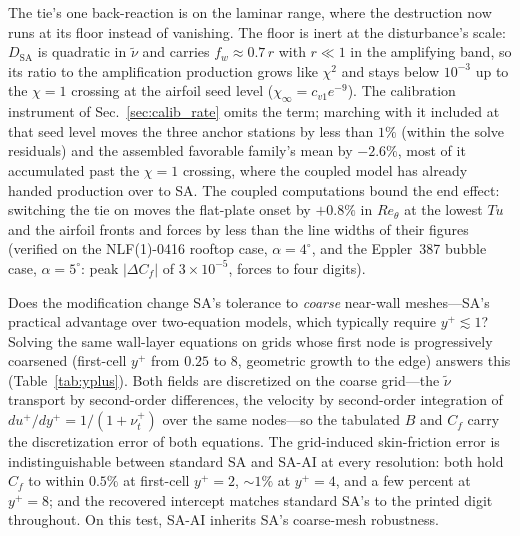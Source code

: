 \documentclass[journal]{new-aiaa}
\begin{document}
The tie's one back-reaction is on the laminar range, where the destruction
now runs at its floor instead of vanishing. The floor is inert at the
disturbance's scale: $D_\mathrm{SA}$ is quadratic in $\tilde\nu$ and
carries $f_w\!\approx\!0.7\,r$ with $r\!\ll\!1$ in the amplifying band,
so its ratio to the amplification production grows like $\chi^2$ and stays
below $10^{-3}$ up to the $\chi\!=\!1$ crossing at the airfoil seed level
($\chi_\infty\!=\!c_{v1}e^{-9}$). The calibration instrument of
Sec.~\ref{sec:calib_rate} omits the term; marching with it included at that
seed level moves the three anchor stations by less than $1\%$ (within the
solve residuals) and the assembled favorable family's mean by $-2.6\%$, most of it accumulated past the $\chi\!=\!1$ crossing,
where the coupled model has already handed production over to SA. The
coupled computations bound the end effect: switching the tie on moves the
flat-plate onset by $+0.8\%$ in $Re_\theta$ at the lowest $Tu$ and the
airfoil fronts and forces by less than the line widths of their figures
(verified on the NLF(1)-0416 rooftop case, $\alpha\!=\!4^\circ$, and the
Eppler~387 bubble case, $\alpha\!=\!5^\circ$: peak $|\Delta C_f|$ of
$3\!\times\!10^{-5}$, forces to four digits).

Does the modification change SA's tolerance to
\emph{coarse} near-wall meshes---SA's practical advantage over two-equation models,
which typically require $y^+\!\lesssim\!1$? Solving the same wall-layer equations on
grids whose first node is progressively coarsened (first-cell $y^+$ from $0.25$ to
$8$, geometric growth to the edge) answers this (Table~\ref{tab:yplus}). Both
fields are discretized on the coarse grid---the $\tilde\nu$ transport by
second-order differences, the velocity by second-order integration of
$du^+\!/dy^+\!=\!1/(1+\nu_t^+)$ over the same nodes---so the tabulated $B$
and $C_f$ carry the discretization error of both equations.
The grid-induced skin-friction error is indistinguishable between standard SA and
SA-AI at every resolution: both hold $C_f$ to within $0.5\%$ at first-cell
$y^+\!=\!2$, $\sim\!1\%$ at $y^+\!=\!4$, and a few percent at
$y^+\!=\!8$; and the recovered intercept matches standard SA's to the
printed digit throughout. On this test, SA-AI inherits SA's coarse-mesh
robustness.
\end{document}
